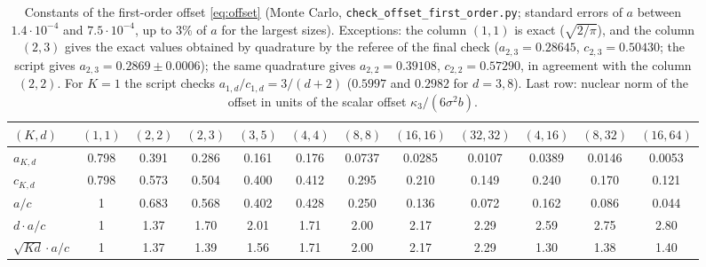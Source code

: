 \documentclass[11pt]{article}
\theoremstyle{definition}
\theoremstyle{remark}
\begin{document}
\begin{table}[t]
\centering\small
\begin{tabular}{@{}lccccccccccc@{}}
\toprule
$(K,d)$ & $(1,1)$ & $(2,2)$ & $(2,3)$ & $(3,5)$ & $(4,4)$ & $(8,8)$ & $(16,16)$ & $(32,32)$ & $(4,16)$ & $(8,32)$ & $(16,64)$\\
\midrule
$a_{K,d}$ & 0.798 & 0.391 & 0.286 & 0.161 & 0.176 & 0.0737 & 0.0285 & 0.0107 & 0.0389 & 0.0146 & 0.0053\\
$c_{K,d}$ & 0.798 & 0.573 & 0.504 & 0.400 & 0.412 & 0.295 & 0.210 & 0.149 & 0.240 & 0.170 & 0.121\\
$a/c$ & 1 & 0.683 & 0.568 & 0.402 & 0.428 & 0.250 & 0.136 & 0.072 & 0.162 & 0.086 & 0.044\\
$d\cdot a/c$ & 1 & 1.37 & 1.70 & 2.01 & 1.71 & 2.00 & 2.17 & 2.29 & 2.59 & 2.75 & 2.80\\
$\sqrt{Kd}\cdot a/c$ & 1 & 1.37 & 1.39 & 1.56 & 1.71 & 2.00 & 2.17 & 2.29 & 1.30 & 1.38 & 1.40\\
\bottomrule
\end{tabular}
\caption{Constants of the first-order offset \eqref{eq:offset} (Monte Carlo, \texttt{check\_offset\_first\_order.py};
standard errors of $a$ between $1.4\cdot10^{-4}$ and $7.5\cdot10^{-4}$, up to $3\%$ of $a$ for the largest sizes).
Exceptions: the column $(1,1)$ is exact ($\sqrt{2/\pi}$), and the column $(2,3)$ gives the exact values obtained by
quadrature by the referee of the final check ($a_{2,3}=0.28645$, $c_{2,3}=0.50430$; the script gives
$a_{2,3}=0.2869\pm0.0006$); the same quadrature gives $a_{2,2}=0.39108$, $c_{2,2}=0.57290$, in agreement with the
column $(2,2)$. For $K=1$ the script checks $a_{1,d}/c_{1,d}=3/(d+2)$ ($0.5997$ and $0.2982$ for $d=3,8$). Last row:
nuclear norm of the offset in units of the scalar offset $\kappa_3/(6\sigma^2b)$.}\label{tab:ac}
\end{table}
\end{document}
